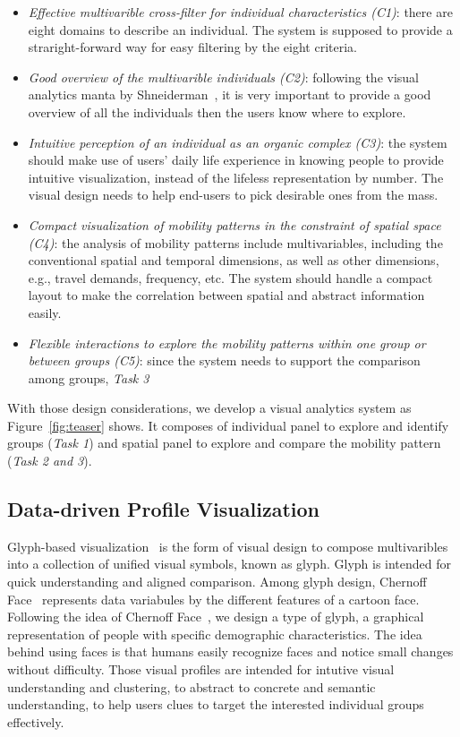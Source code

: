 \begin{itemize}
\item \textit{Effective multivarible cross-filter for individual characteristics (C1)}: there are eight domains to describe an individual. The system is supposed to provide a straright-forward way for easy filtering by the eight criteria.
\item \textit{Good overview of the multivarible individuals (C2)}: following the visual analytics manta by Shneiderman~\cite{RN459}, it is very important to provide a good overview of all the individuals then the users know where to explore. 
\item \textit{Intuitive perception of an individual as an organic complex (C3)}: the system should make use of users' daily life experience in knowing people to provide intuitive visualization, instead of the lifeless representation by number. The visual design needs to help end-users to pick desirable ones from the mass.  
\item \textit{Compact visualization of mobility patterns in the constraint of spatial space (C4)}: the analysis of mobility patterns include multivariables, including the conventional spatial and temporal dimensions, as well as other dimensions, e.g., travel demands, frequency, etc. The system should handle a compact layout to make the correlation between spatial and abstract information easily. 
\item \textit{Flexible interactions to explore the mobility patterns within one group or between groups (C5)}: since the system needs to support the comparison among groups, \textit{Task 3} 
\end{itemize}


With those design considerations, we develop a visual analytics system as Figure~\ref{fig:teaser} shows. It composes of individual panel to explore and identify groups (\textit{Task 1}) and spatial panel to explore and compare the mobility pattern (\textit{Task 2 and 3}). 

\subsection{Data-driven Profile Visualization}

Glyph-based visualization~\cite{borgo2013glyph} is the form of visual design to compose multivaribles into a collection of unified visual symbols, known as glyph. Glyph is intended for quick understanding and aligned comparison. Among glyph design, Chernoff Face~\cite{chernoff1973use} represents data variabules by the different features of a cartoon face. Following the idea of Chernoff Face~\cite{chernoff1973use}, we design a type of glyph, a graphical representation of people with specific demographic characteristics. The idea behind using faces is that humans easily recognize faces and notice small changes without difficulty. Those visual profiles are intended for intutive visual understanding and clustering, to abstract to concrete and semantic understanding, to help users clues to target the interested individual groups effectively.

